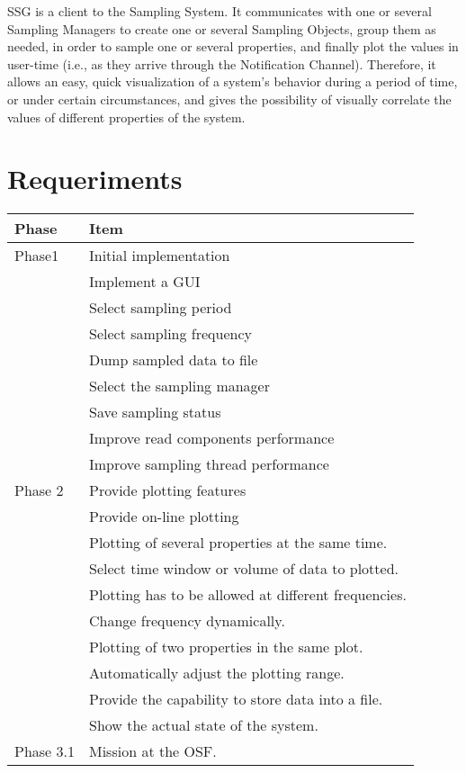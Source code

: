 \documentclass[letter, 10pt]{article}
\begin{document}
SSG is a client to the Sampling System. It communicates with one or several
Sampling Managers to create one or several Sampling Objects, group them as
needed, in order to sample one or several properties, and finally plot the
values in user-time (i.e., as they arrive through the Notification Channel).
Therefore, it allows an easy, quick visualization of a system's behavior during
a period of time, or under certain circumstances, and gives the possibility of
visually correlate the values of different properties of the system.

\section{Requeriments}
\begin{tabular}{|l|p{9.5cm}|}
\hline
\textbf{Phase} & \textbf{Item} \\\hline
Phase1& Initial implementation\\\hline
 	  & Implement a GUI\\\hline
 	  & Select sampling period\\\hline
 	  & Select sampling frequency\\\hline
 	  & Dump sampled data to file\\\hline
 	  & Select the sampling manager\\\hline
 	  & Save sampling status\\\hline
 	  & Improve read components performance\\\hline
 	  & Improve sampling thread performance\\\hline
Phase 2& Provide plotting features\\\hline
 	   & Provide on-line plotting\\\hline
 	   & Plotting of several properties at the same time.\\\hline
 	   & Select time window or volume of data to plotted.\\\hline
 	   & Plotting has to be allowed at different frequencies.\\\hline
 	   & Change frequency dynamically.\\\hline
 	   & Plotting of two properties in the same plot.\\\hline
 	   & Automatically adjust the plotting range.\\\hline
 	   & Provide the capability to store data into a file.\\\hline
 	   & Show the actual state of the system.\\\hline
Phase 3.1& Mission at the OSF.\\\hline

\end{tabular}
\end{document}
